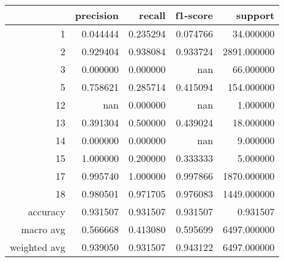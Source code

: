 \begin{tabular}{rrrrr}
\toprule
 & precision & recall & f1-score & support \\
\midrule
1 & 0.044444 & 0.235294 & 0.074766 & 34.000000 \\
2 & 0.929404 & 0.938084 & 0.933724 & 2891.000000 \\
3 & 0.000000 & 0.000000 & nan & 66.000000 \\
5 & 0.758621 & 0.285714 & 0.415094 & 154.000000 \\
12 & nan & 0.000000 & nan & 1.000000 \\
13 & 0.391304 & 0.500000 & 0.439024 & 18.000000 \\
14 & 0.000000 & 0.000000 & nan & 9.000000 \\
15 & 1.000000 & 0.200000 & 0.333333 & 5.000000 \\
17 & 0.995740 & 1.000000 & 0.997866 & 1870.000000 \\
18 & 0.980501 & 0.971705 & 0.976083 & 1449.000000 \\
accuracy & 0.931507 & 0.931507 & 0.931507 & 0.931507 \\
macro avg & 0.566668 & 0.413080 & 0.595699 & 6497.000000 \\
weighted avg & 0.939050 & 0.931507 & 0.943122 & 6497.000000 \\
\bottomrule
\end{tabular}
